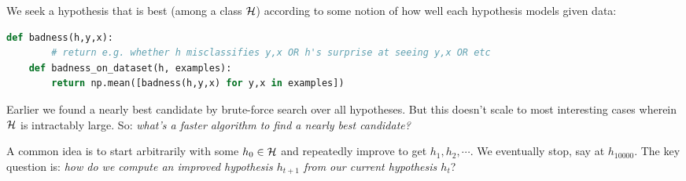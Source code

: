 


  We seek a hypothesis that is best (among a class $\mathcal{H}$) according to some
  notion of how well each hypothesis models given data:
  \begin{lstlisting}[language=Python, basicstyle=\footnotesize\ttfamily]
    def badness(h,y,x):
        # return e.g. whether h misclassifies y,x OR h's surprise at seeing y,x OR etc
    def badness_on_dataset(h, examples):
        return np.mean([badness(h,y,x) for y,x in examples])
  \end{lstlisting}

  Earlier we found a nearly best candidate by brute-force search over all
  hypotheses.  But this doesn't scale to most interesting cases wherein $\mathcal{H}$
  is intractably large.
  So: \emph{what's a faster algorithm to find a nearly best candidate?}

  A common idea is to start arbitrarily with some $h_0\in \mathcal{H}$ and
  repeatedly improve to get $h_1, h_2, \cdots$.  We eventually stop, say at $h_{10000}$.
  The key question is:
  \emph{how do we compute an improved hypothesis $h_{t+1}$ from our current
  hypothesis $h_t$}?

